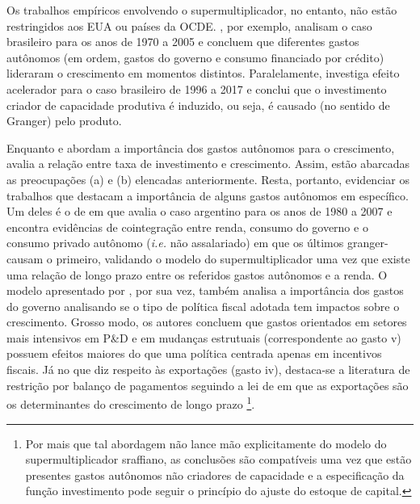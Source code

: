 Os trabalhos empíricos envolvendo o supermultiplicador, no entanto, não estão restringidos aos EUA ou países da OCDE. \textcite{freitas_pattern_2013}, por exemplo, analisam o caso brasileiro para os anos de 1970 a 2005 e concluem que diferentes gastos autônomos (em ordem, gastos do governo e consumo financiado por crédito) lideraram o crescimento em momentos distintos. Paralelamente, \textcite{braga_investment_2018} investiga efeito acelerador para o caso brasileiro de 1996 a 2017 e conclui que o investimento criador de capacidade produtiva é induzido, ou seja, é causado (no sentido de Granger) pelo produto.  

Enquanto \textcite{freitas_pattern_2013} e \textcite{girardi_autonomous_2015} abordam a importância dos gastos autônomos para o crescimento, \textcite{braga_investment_2018} avalia a relação entre taxa de investimento e crescimento. Assim, estão abarcadas as preocupações (a) e (b) elencadas anteriormente. Resta, portanto, evidenciar os trabalhos que destacam a importância de alguns gastos autônomos em específico. Um deles é o de \textcite{medici_cointegration_2011} em que avalia o caso argentino para os anos de 1980 a 2007 e encontra evidências de cointegração entre renda, consumo do governo e o consumo privado autônomo (\textit{i.e.} não assalariado) em que os últimos granger-causam o primeiro, validando o modelo do supermultiplicador uma vez que existe uma relação de longo prazo entre os referidos gastos autônomos e a renda. O modelo apresentado por \textcite{deleidi_mission-oriented_2019}, por sua vez, também analisa a importância dos gastos do governo analisando se o tipo de política fiscal adotada tem impactos sobre o crescimento. Grosso modo, os autores concluem que gastos orientados em setores mais intensivos em P\&D e em mudanças estrutuais (correspondente ao gasto v) possuem efeitos maiores do que uma política centrada apenas em incentivos fiscais. Já no que diz respeito às exportações (gasto iv), destaca-se a literatura de restrição por balanço de pagamentos seguindo a lei de \textcite{mccombie_balance--payments_1994} 
em que as exportações são os determinantes do crescimento de longo prazo \cites{atesoglu_balance--payments-constrained_1993}{mccombie_empirics_1997}{moreno-brid_mexicos_1999}{bertola_balance--payments-constrained_2002}\footnote{Por mais que tal abordagem não lance mão explicitamente do modelo do supermultiplicador sraffiano, as conclusões são compatíveis uma vez que estão presentes gastos autônomos não criadores de capacidade e a especificação da função investimento pode seguir o princípio do ajuste do estoque de capital.}.

